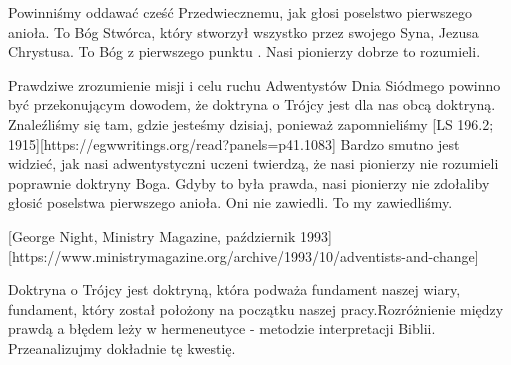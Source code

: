 Powinniśmy oddawać cześć Przedwiecznemu, jak głosi poselstwo pierwszego anioła. To Bóg Stwórca, który stworzył wszystko przez swojego Syna, Jezusa Chrystusa. To Bóg z pierwszego punktu . Nasi pionierzy dobrze to rozumieli.

Prawdziwe zrozumienie misji i celu ruchu Adwentystów Dnia Siódmego powinno być przekonującym dowodem, że doktryna o Trójcy jest dla nas obcą doktryną. Znaleźliśmy się tam, gdzie jesteśmy dzisiaj, ponieważ zapomnieliśmy [LS 196.2; 1915][https://egwwritings.org/read?panels=p41.1083] Bardzo smutno jest widzieć, jak nasi adwentystyczni uczeni twierdzą, że nasi pionierzy nie rozumieli poprawnie doktryny Boga. Gdyby to była prawda, nasi pionierzy nie zdołaliby głosić poselstwa pierwszego anioła. Oni nie zawiedli. To my zawiedliśmy.

[George Night, Ministry Magazine, październik 1993][https://www.ministrymagazine.org/archive/1993/10/adventists-and-change]

Doktryna o Trójcy jest doktryną, która podważa fundament naszej wiary, fundament, który został położony na początku naszej pracy.Rozróżnienie między prawdą a błędem leży w hermeneutyce - metodzie interpretacji Biblii. Przeanalizujmy dokładnie tę kwestię.


